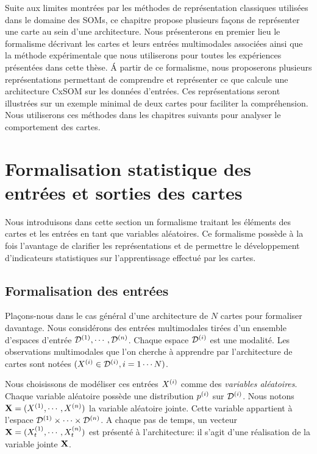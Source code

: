 \documentclass[../main]{subfiles}
\begin{document}
Suite aux limites montrées par les méthodes de représentation classiques utilisées dans le domaine des SOMs, ce chapitre propose plusieurs façons de représenter une carte au sein d'une architecture.
Nous présenterons en premier lieu le formalisme décrivant les cartes et leurs entrées multimodales associées ainsi que la méthode expérimentale que nous utiliserons pour toutes les expériences présentées dans cette thèse. \'A partir de ce formalisme, nous proposerons plusieurs représentations permettant de comprendre et représenter ce que calcule une architecture CxSOM sur les données d'entrées. Ces représentations seront illustrées sur un exemple minimal de deux cartes pour faciliter la compréhension. Nous utiliserons ces méthodes dans les chapitres suivants pour analyser le comportement des cartes.

\section{Formalisation statistique des entrées et sorties des cartes}

Nous introduisons dans cette section un formalisme traitant les éléments des cartes et les entrées en tant que variables aléatoires. 
Ce formalisme possède à la fois l'avantage de clarifier les représentations et de permettre le développement d'indicateurs statistiques sur l'apprentissage effectué par les cartes.

\subsection{Formalisation des entrées}

Plaçons-nous dans le cas général d'une architecture de $N$ cartes pour formaliser davantage.
Nous considérons des entrées multimodales tirées d'un ensemble d'espaces d'entrée $\mathcal{D}^{({1})},\cdots,\mathcal{D}^{({n})}$. Chaque espace $\mathcal{D}^{({i})}$ est une modalité.
Les observations multimodales que l'on cherche à apprendre par l'architecture de cartes sont notées $(X^{({i})} \in \mathcal{D}^{({i})}, i = 1 \cdots N)$.

Nous choisissons de modéliser ces entrées $X^{({i})}$ comme des \emph{variables aléatoires}.
Chaque variable aléatoire possède une distribution $p^{({i})}$ sur $\mathcal{D}^{({i})}$.
Nous notons $\mathbf{X} = (X^{({1})}, \cdots, X^{({n})})$ la variable aléatoire jointe.
Cette variable appartient à l'espace $\mathcal{D}^{({1})} \times \cdots \times \mathcal{D}^{({n})}$.
A chaque pas de temps, un vecteur $\mathbf{X} = (X^{({1})}_t, \cdots , X^{({n})}_t)$ est présenté à l'architecture: il s'agit d'une réalisation de la variable jointe $\mathbf{X}$. 
\end{document}
